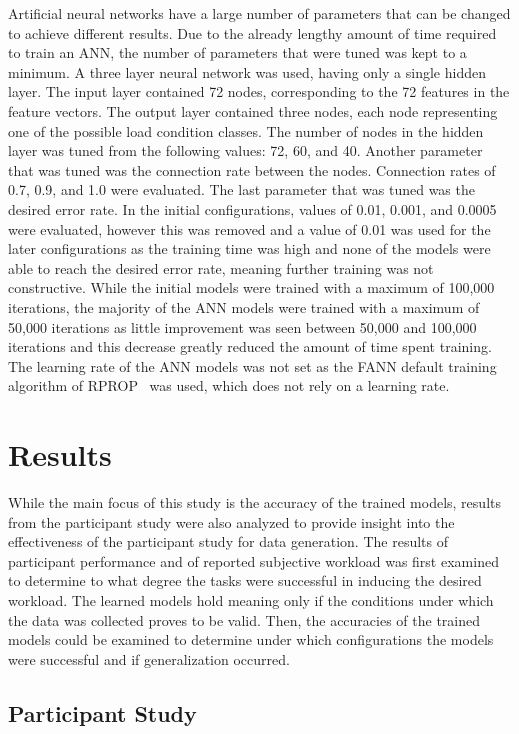 \documentclass[11pt]{article}
\begin{document}
		Artificial neural networks have a large number of parameters that can be changed to achieve different results. Due to the already lengthy amount of time required to train an ANN, the number of parameters that were tuned was kept to a minimum. A three layer neural network was used, having only a single hidden layer. The input layer contained 72 nodes, corresponding to the 72 features in the feature vectors. The output layer contained three nodes, each node representing one of the possible load condition classes. The number of nodes in the hidden layer was tuned from the following values: 72, 60, and 40. Another parameter that was tuned was the connection rate between the nodes. Connection rates of 0.7, 0.9, and 1.0 were evaluated. The last parameter that was tuned was the desired error rate. In the initial configurations, values of 0.01, 0.001, and 0.0005 were evaluated, however this was removed and a value of 0.01 was used for the later configurations as the training time was high and none of the models were able to reach the desired error rate, meaning further training was not constructive. While the initial models were trained with a maximum of 100,000 iterations, the majority of the ANN models were trained with a maximum of 50,000 iterations as little improvement was seen between 50,000 and 100,000 iterations and this decrease greatly reduced the amount of time spent training. The learning rate of the ANN models was not set as the FANN default training algorithm of RPROP~\cite{Riedmiller} was used, which does not rely on a learning rate.

\section{Results}
While the main focus of this study is the accuracy of the trained models, results from the participant study were also analyzed to provide insight into the effectiveness of the participant study for data generation. The results of participant performance and of reported subjective workload was first examined to determine to what degree the tasks were successful in inducing the desired workload. The learned models hold meaning only if the conditions under which the data was collected proves to be valid. Then, the accuracies of the trained models could be examined to determine under which configurations the models were successful and if generalization occurred. 

	\subsection{Participant Study}
		
\end{document}
